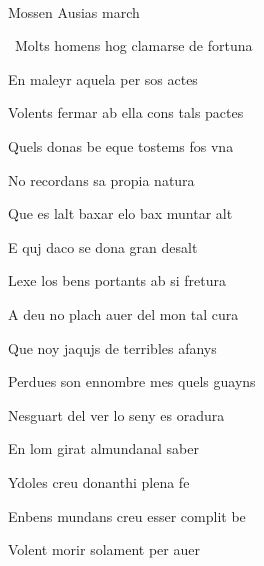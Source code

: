\documentclass[12pt]{article}
\renewcommand{\espaiAbansEtiquetaPoema}{\vspace{0ex}}
\begin{document}
\begin{estrofa}

\espaiAbansEtiquetaPoema

\\

\begin{rubrica}

\textsection{} Mossen Ausias march \textsection{}

\end{rubrica}

\end{estrofa}


\begin{estrofa}

 \textparagraph\  Molts homens hog clamarse de fortuna

 En maleyr aquela per sos actes

 Volents fermar ab ella cons tals pactes

 Quels donas be eque tostems fos vna

 No recordans sa propia natura

 Que es lalt baxar elo bax muntar alt

 E quj daco se dona gran desalt

 Lexe los bens portants ab si fretura

\end{estrofa}



\begin{estrofa}

 A deu no plach auer del mon tal cura

 Que noy jaqujs de terribles afanys

 Perdues son ennombre mes quels guayns

 Nesguart del ver lo seny es oradura

 En lom girat almundanal saber

 Ydoles creu donanthi plena fe

 Enbens mundans creu esser complit be

 Volent morir solament per auer

\end{estrofa}
\end{document}
